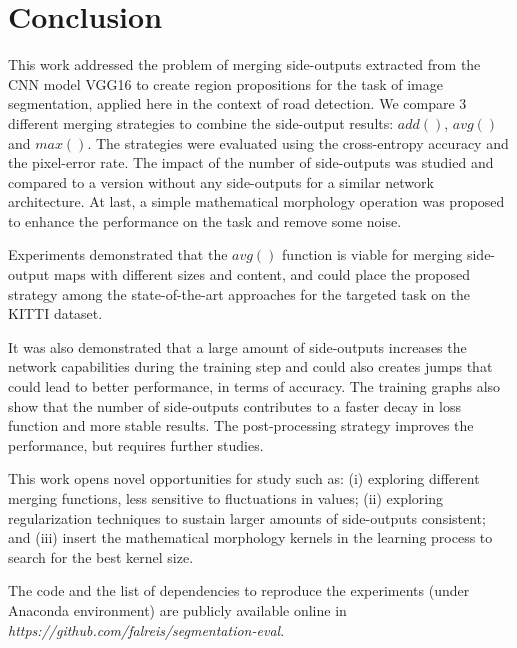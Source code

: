 \section{Conclusion}
\label{sec:conclusion}

This work addressed the problem of merging side-outputs extracted from the CNN model VGG16 to create region propositions for the task of image segmentation, applied here in the context of road detection. We compare 3 different merging strategies to combine the side-output results: $add()$, $avg()$ and $max()$. The strategies were evaluated using the cross-entropy accuracy and the pixel-error rate. The impact of the number of side-outputs was studied and compared to a version without any side-outputs for a similar network architecture. At last, a simple mathematical morphology operation was proposed to enhance the performance on the task and remove some noise. 

Experiments demonstrated that the $avg()$ function is viable for merging side-output maps with different sizes and content, and could place the proposed strategy among the state-of-the-art approaches for the targeted task on the KITTI dataset. 

It was also demonstrated that a large amount of side-outputs increases the network capabilities during the training step and could also creates jumps that could lead to better performance, in terms of accuracy. The training graphs also show that the number of side-outputs contributes to a faster decay in loss function and more stable results. The post-processing strategy improves the performance, but requires further studies. %

This work opens novel opportunities for study such as: (i) exploring different merging functions, less sensitive to fluctuations in values;  (ii) exploring regularization techniques to sustain larger amounts of side-outputs consistent; and (iii) insert the mathematical morphology kernels in the learning process to search for the best kernel size. 
 
The code and the list of dependencies to reproduce the experiments (under Anaconda environment) are publicly available online in \textit{https://github.com/falreis/segmentation-eval}. 